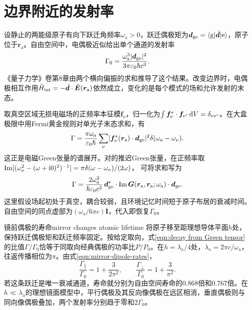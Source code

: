 \section{边界附近的发射率}
\label{sec:cavity spontaneous emission}

设静止的两能级原子有向下跃迁角频率$\omega_{\mathrm{a}} > 0$，跃迁偶极矩为$\bm d_{\mathrm{g}\mathrm{e}} = \langle\mathrm{g}\vert\hat{\bm d}\vert\mathrm{e}\rangle$，原子位于$\bm r_{\mathrm{a}}$。自由空间中，电偶极近似给出单个通道的发射率
\begin{equation}
    \label{eq:ed-vacuum-emission-rate}
    \Gamma_0 = \frac{\omega_{\mathrm{a}}^3\lvert\bm d_{\mathrm{g}\mathrm{e}}\rvert^2}{3\pi\varepsilon_0\hbar c^3}.
\end{equation}
《量子力学》卷第8章由两个横向偏振的求和推导了这个结果。改变边界时，电偶极相互作用$\hat H_{\rm int} = -\hat{\bm d} \cdot \hat{\bm E}(\bm r_{\mathrm{a}})$依然成立，变化的是每个模式的场和允许发射的末态。

取真空区域无损电磁场的正频率本征模$\bm f_\nu$，归一化为$\textstyle \int \bm f_\nu^\ast \cdot \bm f_{\nu'}\mathop{}\!\mathrm{d} V = \delta_{\nu\nu'}$。在大盒极限中用Fermi黄金规则对单光子末态求和，有
\begin{equation}
    \label{eq:ed-mode-summed-emission}
    \Gamma = \frac{\pi\omega_{\mathrm{a}}}{\varepsilon_0\hbar}
       \sum_\nu\lvert\bm f_\nu^\ast(\bm r_{\mathrm{a}}) \cdot \bm d_{\mathrm{g}\mathrm{e}}\rvert^2
                \delta(\omega_{\mathrm{a}} - \omega_\nu).
\end{equation}
这正是电磁Green张量的谱展开。对的推迟Green张量，在正频率取
$\operatorname{Im}[(\omega_\nu^2 - (\omega + \mathrm{i}0)^2)^{-1}] = \pi\delta(\omega - \omega_\nu)/(2\omega)$，
可将求和写为
\begin{equation}
    \Gamma = \frac{2\omega_{\mathrm{a}}^2}{\hbar\varepsilon_0 c^2}\,
    \bm d_{\mathrm{g}\mathrm{e}}^\ast \cdot \operatorname{Im}\bm G(\bm r_{\mathrm{a}},\bm r_{\mathrm{a}};\omega_{\mathrm{a}}) \cdot \bm d_{\mathrm{g}\mathrm{e}}.
    \label{eqn:decay from Green tensor}
\end{equation}
这里假设场起初处于真空，耦合较弱，且环境记忆时间短于原子布居的衰减时间。自由空间的同点虚部为$(\omega_{\mathrm{a}}/6\pi c)\bm I$，代入即恢复$\Gamma_0$。

\begin{example}{镜前偶极的寿命}{mirror changes atomic lifetime}
    将原子移至距理想导体平面$h$处，保持跃迁偶极矩和跃迁频率固定。按给定取向，式\eqref{eqn:decay from Green tensor}的比值$\Gamma/\Gamma_0$恰等于同取向经典偶极的功率比$P/P_0$。在$h = \lambda_{\mathrm{a}}/4$处，$\lambda_{\mathrm{a}} = 2\pi c/\omega_{\mathrm{a}}$，往返传播相位为$\pi$。由式\eqref{eqn:mirror-dipole-rates}，
    \[
        \frac{\Gamma_\parallel}{\Gamma_0} = 1 + \frac{3}{2\pi^2},
        \qquad \frac{\Gamma_\perp}{\Gamma_0} = 1 + \frac{3}{\pi^2}.
    \]
    若这条跃迁是唯一衰减通道，寿命就分别为自由空间寿命的$0.868$倍和$0.767$倍。在$h \ll \lambda_{\mathrm{a}}$的理想镜面模型中，平行偶极及其反向像偶极在远区相消，垂直偶极则与同向像偶极叠加，两个发射率分别趋于零和$2\Gamma_0$。
\end{example}

